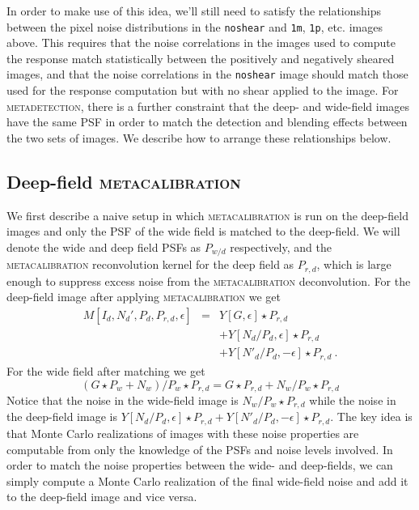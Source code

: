 \documentclass[twocolumn]{openjournal}
\makeatletter
\newcommand{\mdet}{\textsc{metadetection}\@\xspace}
\newcommand{\mcal}{\textsc{metacalibration}\@\xspace}
\newcommand{\noshear}{\texttt{noshear}\@\xspace}
\makeatother
\begin{document}
In order to make use of this idea, we'll still need to satisfy the relationships between
the pixel noise distributions in the \noshear and \texttt{1m}, \texttt{1p}, etc. images
above. This requires that the noise correlations in the images used to compute
the response match statistically between the positively and negatively sheared images,
and that the noise correlations in the \noshear image should match those used for the
response computation but with no shear applied to the image. For \mdet, there
is a further constraint that the deep- and wide-field images have the same PSF in order
to match the detection and blending effects between the two sets of images. We describe
how to arrange these relationships below.

\subsection{Deep-field \mcal}\label{sec:deepmcal}

We first describe a naive setup in which \mcal is run on the deep-field images
and only the PSF of the wide field is matched to the deep-field.  We will
denote the wide and deep field PSFs as $P_{w/d}$ respectively, and
the \mcal reconvolution kernel for the deep field as $P_{r,d}$, which is
large enough to suppress excess noise from the \mcal deconvolution.
For the deep-field image after applying \mcal we get
\begin{eqnarray}
M[I_{d}, N_{d}', P_{d}, P_{r,d}, \epsilon] & = & Y[G, \epsilon] \star P_{r,d} \nonumber \\
  & & + Y[N_{d}/P_{d}, \epsilon] \star P_{r,d} \nonumber \\
  & & + Y[N'_d/P_d, -\epsilon] \star P_{r,d} \nonumber\ .
\end{eqnarray}
For the wide field after matching we get
\begin{equation*}
  \left(G\star P_{w} + N_{w}\right)/P_{w} \star P_{r,d} = G \star P_{r,d} + N_{w}/P_{w} \star P_{r,d}
\end{equation*}
Notice that the noise in the wide-field image is
$N_{w}/P_{w} \star P_{r,d}$ while the noise in the deep-field image is $Y[N_{d}/P_{d},
\epsilon] \star P_{r,d} + Y[N'_d/P_d, -\epsilon] \star P_{r,d}$. The key idea is that
Monte Carlo realizations of images with these noise properties are computable from only
the knowledge of the PSFs and noise levels involved. In order to match
the noise properties between the wide- and deep-fields, we can simply compute a Monte
Carlo realization of the final wide-field noise and add it to the deep-field image and
vice versa.
\end{document}
